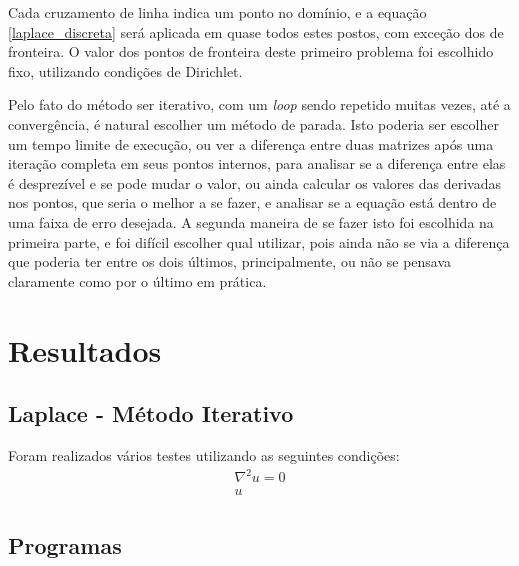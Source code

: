 \documentclass[journal]{IEEEtran}
\begin{document}

Cada cruzamento de linha indica um ponto no domínio, e a equação \ref{laplace_discreta} será aplicada em quase todos estes postos, com exceção dos de fronteira. O valor dos pontos de fronteira deste primeiro problema foi escolhido fixo, utilizando condições de Dirichlet. 

Pelo fato do método ser iterativo, com um \textit{loop} sendo repetido muitas vezes, até a convergência, é natural escolher um método de parada. Isto poderia ser escolher um tempo limite de execução, ou ver a diferença entre duas matrizes após uma iteração completa em seus pontos internos, para analisar se a diferença entre elas é desprezível e se pode mudar o valor, ou ainda calcular os valores das derivadas nos pontos, que seria o melhor a se fazer, e analisar se a equação está dentro de uma faixa de erro desejada. A segunda maneira de se fazer isto foi escolhida na primeira parte, e foi difícil escolher qual utilizar, pois ainda não se via a diferença que poderia ter entre os dois últimos, principalmente, ou não se pensava claramente como por o último em prática.
\section{Resultados}
\subsection{Laplace - Método Iterativo}
Foram realizados vários testes utilizando as seguintes condições:
\begin{eqnarray}
\nabla^2 u=0\\
u_{}
\end{eqnarray}
\newpage
\subsection{Programas\label{exemplos}}
\newpage
\end{document}
